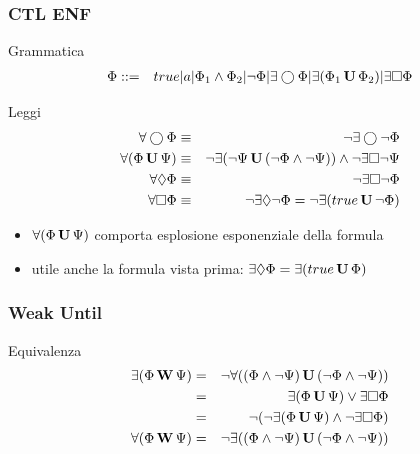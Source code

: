 \begin{frame}
  \frametitle{\ac{CTL} \ac{ENF}}
  \begin{block}{Grammatica}
   \begin{eqnarray*}
     \Phi &::=& true|a|\Phi_1\land
     \Phi_2|\neg\Phi|\exists\bigcirc\Phi|\exists(\Phi_1\,\mathbf{U}\,\Phi_2)|
     \exists\Box\Phi
   \end{eqnarray*}
  \end{block}
  \begin{block}{Leggi}
    \begin{eqnarray*}
      \forall\bigcirc\Phi&\equiv&\neg\exists\bigcirc\neg\Phi\\
      \forall(\Phi\,\mathbf{U}\,\Psi)&\equiv&\neg\exists(\neg\Psi\,\mathbf{U}\,(\neg\Phi\land\neg\Psi))\land\neg\exists\Box\neg\Psi\\
      \forall\Diamond\Phi&\equiv&\neg\exists\Box\neg\Phi\\
      \forall\Box\Phi&\equiv&\neg\exists\Diamond\neg\Phi=\neg\exists(true\,\mathbf{U}\,\neg\Phi)
    \end{eqnarray*}
  \end{block}
  \begin{itemize}
  \item $\forall(\Phi\,\mathbf{U}\,\Psi)$ comporta esplosione esponenziale
    della formula
  \item utile anche la formula vista prima: $\exists\Diamond\Phi = \exists(true\,\mathbf{U}\,\Phi)$
  \end{itemize}
\end{frame}

\begin{frame}
  \frametitle{Weak Until}
  \begin{block}{Equivalenza}
    \begin{eqnarray*}
    \exists(\Phi\,\mathbf{W}\,\Psi) &=&
    \neg\forall((\Phi\land\neg\Psi)\,\mathbf{U}\,(\neg\Phi\land\neg\Psi))\\
    &=&\exists(\Phi\,\mathbf{U}\,\Psi)\lor\exists\Box\Phi\\
    &=&\neg(\neg\exists(\Phi\,\mathbf{U}\,\Psi)\land\neg\exists\Box\Phi)\\
    \forall(\Phi\,\mathbf{W}\,\Psi) &=& \neg\exists((\Phi\land\neg\Psi)\,\mathbf{U}\,(\neg\Phi\land\neg\Psi))
    \end{eqnarray*}
  \end{block}
\end{frame}

